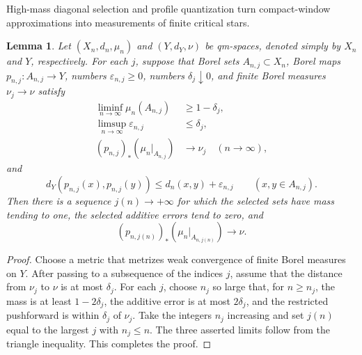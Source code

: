 \documentclass[10pt,a4paper]{amsart}
\numberwithin{equation}{section}
\newtheorem{lemma}[theorem]{Lemma}
\begin{document}
High-mass diagonal selection and profile quantization turn compact-window approximations into measurements of finite critical stars.

\begin{lemma}\label{lem:diagonal-high-mass-selection}
Let $(X_n,d_n,\mu_n)$ and $(Y,d_Y,\nu)$ be qm-spaces, denoted simply by $X_n$ and $Y$, respectively.  For each $j$, suppose that Borel sets $A_{n,j}\subset X_n$, Borel maps $p_{n,j}\colon A_{n,j}\to Y$, numbers $\varepsilon_{n,j}\ge0$, numbers $\delta_j\downarrow0$, and finite Borel measures $\nu_j\to\nu$ satisfy
\begin{align*}
 \liminf_{n\to\infty}\mu_n(A_{n,j})&\ge1-\delta_j,\\
 \limsup_{n\to\infty}\varepsilon_{n,j}&\le\delta_j,\\
(p_{n,j})_*(\mu_n|_{A_{n,j}})&\longrightarrow\nu_j \quad(n\to\infty),
\end{align*}
and
\[ d_Y(p_{n,j}(x),p_{n,j}(y)) \le d_n(x,y)+\varepsilon_{n,j} \qquad(x,y\in A_{n,j}). \]
Then there is a sequence $j(n)\to+\infty$ for which the selected sets have mass tending to one, the selected additive errors tend to zero, and
\[ (p_{n,j(n)})_*(\mu_n|_{A_{n,j(n)}})\longrightarrow\nu. \]
\end{lemma}

\begin{proof}
Choose a metric that metrizes weak convergence of finite Borel measures on $Y$.  After passing to a subsequence of the indices $j$, assume that the distance from $\nu_j$ to $\nu$ is at most $\delta_j$.  For each $j$, choose $n_j$ so large that, for $n\ge n_j$, the mass is at least $1-2\delta_j$, the additive error is at most $2\delta_j$, and the restricted pushforward is within $\delta_j$ of $\nu_j$.  Take the integers $n_j$ increasing and set $j(n)$ equal to the largest $j$ with $n_j\le n$.  The three asserted limits follow from the triangle inequality.
	This completes the proof.
\end{proof}
\end{document}
